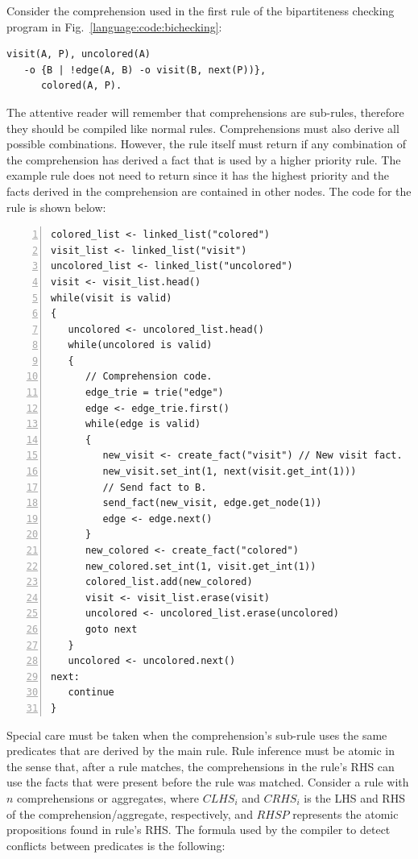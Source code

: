 Consider the comprehension used in the first rule of the bipartiteness checking
program in Fig.~\ref{language:code:bichecking}:

\begin{Verbatim}[fontsize=\codesize]
visit(A, P), uncolored(A)
   -o {B | !edge(A, B) -o visit(B, next(P))},
      colored(A, P).
\end{Verbatim}

The attentive reader will remember that comprehensions are sub-rules, therefore
they should be compiled like normal rules. Comprehensions must also derive all
possible combinations. However, the rule itself must return if any combination
of the comprehension has derived a fact that is used by a higher priority rule.
The example rule does not need to return since it has the highest priority and
the  facts derived in the comprehension are contained in other
nodes. The code for the rule is shown below:

\begin{Verbatim}[numbers=left,fontsize=\codesize]
colored_list <- linked_list("colored")
visit_list <- linked_list("visit")
uncolored_list <- linked_list("uncolored")
visit <- visit_list.head()
while(visit is valid)
{
   uncolored <- uncolored_list.head()
   while(uncolored is valid)
   {
      // Comprehension code.
      edge_trie = trie("edge")
      edge <- edge_trie.first()
      while(edge is valid)
      {
         new_visit <- create_fact("visit") // New visit fact.
         new_visit.set_int(1, next(visit.get_int(1)))
         // Send fact to B.
         send_fact(new_visit, edge.get_node(1))
         edge <- edge.next()
      }
      new_colored <- create_fact("colored")
      new_colored.set_int(1, visit.get_int(1))
      colored_list.add(new_colored)
      visit <- visit_list.erase(visit)
      uncolored <- uncolored_list.erase(uncolored)
      goto next
   }
   uncolored <- uncolored.next()
next:
   continue
}
\end{Verbatim}

Special care must be taken when the comprehension's sub-rule uses the same
predicates that are derived by the main rule. Rule inference must be atomic in
the sense that, after a rule matches, the comprehensions in the rule's RHS can
use the facts that were present before the rule was matched. Consider a rule
with $n$ comprehensions or aggregates, where $CLHS_i$ and $CRHS_i$ is the LHS
and RHS of the comprehension/aggregate, respectively, and $RHSP$ represents the
atomic propositions found in rule's RHS. The formula used by the compiler to
detect conflicts between predicates is the following:

